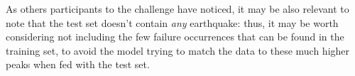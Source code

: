 As others participants to the challenge have noticed, it may be also relevant to note that the test set doesn't contain \textit{any} earthquake: thus, it may be worth considering not including the few failure occurrences that can be found in the training set, to avoid the model trying to match the data to these much higher peaks when fed with the test set.
